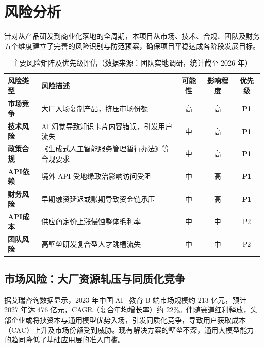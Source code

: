 ﻿%

\chapter{风险分析}

针对从产品研发到商业化落地的全周期，本项目从市场、技术、合规、团队及财务五个维度建立了完善的风险识别与防范预案，确保项目平稳达成各阶段发展目标。

\begin{table}[htbp]
  \centering
  \caption{主要风险矩阵及优先级评估（数据来源：团队实地调研，统计截至 2026 年）}
  \begin{tabular}{lp{6.5cm}ccc}
    \toprule
    \textbf{风险类型} & \textbf{风险描述} & \textbf{可能性} & \textbf{影响程度} & \textbf{优先级} \\
    \midrule
    \textbf{市场竞争} & 大厂入场复制产品，挤压市场份额 & 高 & 高 & \textbf{P1} \\
    \textbf{技术风险} & AI 幻觉导致知识卡片内容错误，引发用户流失 & 中 & 高 & \textbf{P1} \\
    \textbf{政策合规} & 《生成式人工智能服务管理暂行办法》等合规要求 & 中 & 高 & \textbf{P1} \\
    \textbf{API依赖} & 境外 API 受地缘政治影响访问受阻 & 中 & 高 & \textbf{P1} \\
    \textbf{财务风险} & 早期融资延迟或账期导致资金链承压 & 中 & 高 & \textbf{P1} \\
    \textbf{API成本} & 供应商定价上涨侵蚀整体毛利率 & 中 & 中 & P2 \\
    \textbf{团队风险} & 高壁垒研发复合型人才跳槽流失 & 中 & 中 & P2 \\
    \bottomrule
  \end{tabular}
\end{table}

\section{市场风险：大厂资源轧压与同质化竞争}

据艾瑞咨询数据显示，2023 年中国 AI+教育 B 端市场规模约 213 亿元，预计 2027 年达 476 亿元，CAGR（复合年均增长率）约 22\%。伴随赛道红利释放，头部企业或将挟资本与通用模型优势入场，引发同质化竞争，导致用户获取成本（CAC）上升及市场份额受到威胁。现有解决方案的壁垒不深，通用大模型能力的趋同降低了基础应用层的准入门槛。

